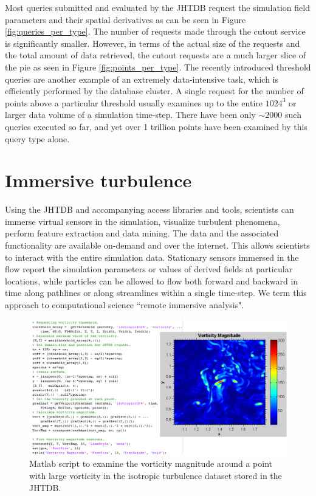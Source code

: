 \documentclass[10pt,twocolumn]{article}
\begin{document}
Most queries submitted and evaluated by the JHTDB request the simulation field parameters and their spatial derivatives as can be seen in Figure
\ref{fig:queries_per_type}. The number of requests made through the cutout service is significantly smaller. However, in terms of the actual size of the requests
and the total amount of data retrieved, the cutout requests are a much larger slice of the pie as seen in Figure \ref{fig:points_per_type}. The recently introduced
threshold queries are another example of an extremely data-intensive task, which is efficiently performed by the database cluster. A single request for the 
number of points above a particular threshold usually examines up to the entire $1024^3$ or larger data volume of a simulation time-step. 
There have been only $\sim2000$ such queries executed so far, and yet over 1 trillion points have been examined by this query type alone.

\section{Immersive turbulence}
Using the JHTDB and accompanying access libraries and tools, scientists can immerse virtual sensors in the simulation, visualize turbulent phenomena, 
perform feature extraction and data mining. The data and the associated functionality are available on-demand and over the internet. This allows scientists 
to interact with the entire simulation data. Stationary sensors immersed in the flow report the simulation parameters or values of derived fields at particular 
locations, while particles can be allowed to flow both forward and backward in time along pathlines or along streamlines within a single time-step. 
We term this approach to computational science ``remote immersive analysis".

\begin{figure}
\includegraphics[width=1.0\textwidth]{vorticity.png}
\caption{Matlab script to examine the vorticity magnitude around a point with large vorticity in the isotropic turbulence dataset stored in the JHTDB.}
\label{fig:vorticity}
\end{figure}
\end{document}
